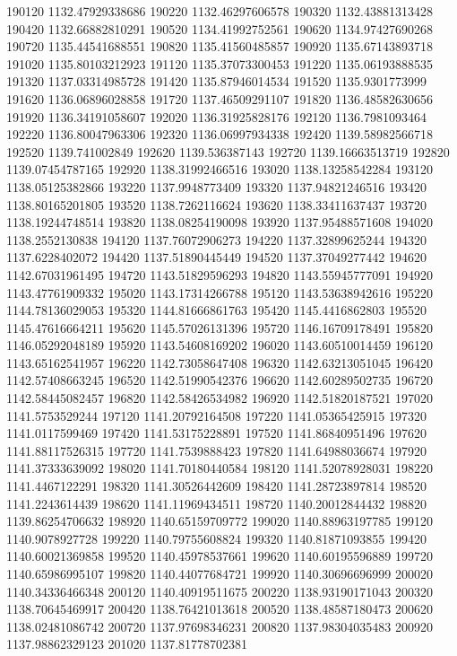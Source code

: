 {190120 1132.47929338686
190220 1132.46297606578
190320 1132.43881313428
190420 1132.66882810291
190520 1134.41992752561
190620 1134.97427690268
190720 1135.44541688551
190820 1135.41560485857
190920 1135.67143893718
191020 1135.80103212923
191120 1135.37073300453
191220 1135.06193888535
191320 1137.03314985728
191420 1135.87946014534
191520 1135.9301773999
191620 1136.06896028858
191720 1137.46509291107
191820 1136.48582630656
191920 1136.34191058607
192020 1136.31925828176
192120 1136.7981093464
192220 1136.80047963306
192320 1136.06997934338
192420 1139.58982566718
192520 1139.741002849
192620 1139.536387143
192720 1139.16663513719
192820 1139.07454787165
192920 1138.31992466516
193020 1138.13258542284
193120 1138.05125382866
193220 1137.9948773409
193320 1137.94821246516
193420 1138.80165201805
193520 1138.7262116624
193620 1138.33411637437
193720 1138.19244748514
193820 1138.08254190098
193920 1137.95488571608
194020 1138.2552130838
194120 1137.76072906273
194220 1137.32899625244
194320 1137.6228402072
194420 1137.51890445449
194520 1137.37049277442
194620 1142.67031961495
194720 1143.51829596293
194820 1143.55945777091
194920 1143.47761909332
195020 1143.17314266788
195120 1143.53638942616
195220 1144.78136029053
195320 1144.81666861763
195420 1145.4416862803
195520 1145.47616664211
195620 1145.57026131396
195720 1146.16709178491
195820 1146.05292048189
195920 1143.54608169202
196020 1143.60510014459
196120 1143.65162541957
196220 1142.73058647408
196320 1142.63213051045
196420 1142.57408663245
196520 1142.51990542376
196620 1142.60289502735
196720 1142.58445082457
196820 1142.58426534982
196920 1142.51820187521
197020 1141.5753529244
197120 1141.20792164508
197220 1141.05365425915
197320 1141.0117599469
197420 1141.53175228891
197520 1141.86840951496
197620 1141.88117526315
197720 1141.7539888423
197820 1141.64988036674
197920 1141.37333639092
198020 1141.70180440584
198120 1141.52078928031
198220 1141.4467122291
198320 1141.30526442609
198420 1141.28723897814
198520 1141.2243614439
198620 1141.11969434511
198720 1140.20012844432
198820 1139.86254706632
198920 1140.65159709772
199020 1140.88963197785
199120 1140.9078927728
199220 1140.79755608824
199320 1140.81871093855
199420 1140.60021369858
199520 1140.45978537661
199620 1140.60195596889
199720 1140.65986995107
199820 1140.44077684721
199920 1140.30696696999
200020 1140.34336466348
200120 1140.40919511675
200220 1138.93190171043
200320 1138.70645469917
200420 1138.76421013618
200520 1138.48587180473
200620 1138.02481086742
200720 1137.97698346231
200820 1137.98304035483
200920 1137.98862329123
201020 1137.81778702381
}
